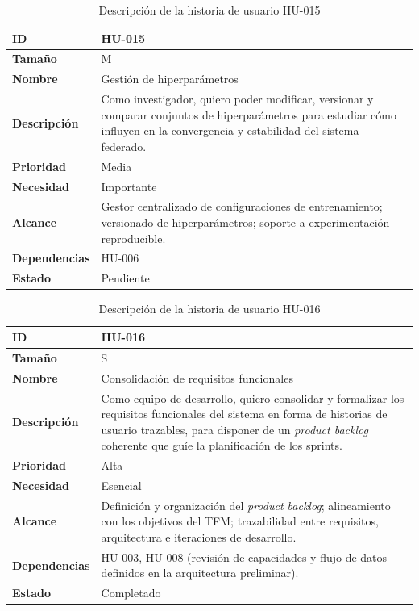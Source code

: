 \documentclass{report}
\begin{document}
\begin{table}[H]
\centering
\caption{Descripción de la historia de usuario HU-015}
\label{tab:hu015}
\begin{tabular}{|l|p{12cm}|}
\hline
\textbf{ID} & HU-015 \\ \hline
\textbf{Tamaño} & M \\ \hline
\textbf{Nombre} & Gestión de hiperparámetros \\ \hline
\textbf{Descripción} & 
Como investigador, quiero poder modificar, versionar y comparar conjuntos de hiperparámetros para estudiar cómo influyen en la convergencia y estabilidad del sistema federado. \\ \hline
\textbf{Prioridad} & Media \\ \hline
\textbf{Necesidad} & Importante \\ \hline
\textbf{Alcance} & Gestor centralizado de configuraciones de entrenamiento; versionado de hiperparámetros; soporte a experimentación reproducible. \\ \hline
\textbf{Dependencias} & HU-006 \\ \hline
\textbf{Estado} & Pendiente \\ \hline
\end{tabular}
\end{table}



\begin{table}[H]
\centering
\caption{Descripción de la historia de usuario HU-016}
\label{tab:hu016}
\begin{tabular}{|l|p{12cm}|}
\hline
\textbf{ID} & HU-016 \\ \hline
\textbf{Tamaño} & S \\ \hline
\textbf{Nombre} & Consolidación de requisitos funcionales \\ \hline
\textbf{Descripción} & 
Como equipo de desarrollo, quiero consolidar y formalizar los requisitos funcionales del sistema en forma de historias de usuario trazables, para disponer de un \textit{product backlog} coherente que guíe la planificación de los sprints. \\ \hline
\textbf{Prioridad} & Alta \\ \hline
\textbf{Necesidad} & Esencial \\ \hline
\textbf{Alcance} & Definición y organización del \textit{product backlog}; alineamiento con los objetivos del TFM; trazabilidad entre requisitos, arquitectura e iteraciones de desarrollo. \\ \hline
\textbf{Dependencias} & HU-003, HU-008 (revisión de capacidades y flujo de datos definidos en la arquitectura preliminar). \\ \hline
\textbf{Estado} & Completado \\ \hline
\end{tabular}
\end{table}
\end{document}

